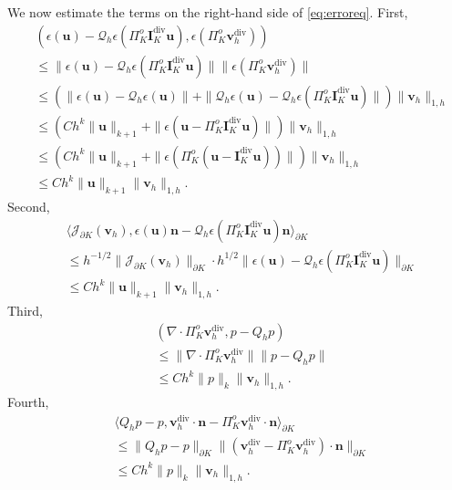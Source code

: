 \documentclass[review,hidelinks,onefignum,onetabnum]{siamart251216}
\begin{document}
We now estimate the terms on the right-hand side of \eqref{eq:erroreq}.
First,
\begin{align*}
& (\epsilon(\boldsymbol{u}) - \mathcal{Q}_h \epsilon(\Pi_K^o \boldsymbol{I}_K^{\operatorname{div}} \boldsymbol{u}), \epsilon(\Pi_K^o \boldsymbol{v}_h^{\operatorname{div}})) \\
&\le \| \epsilon(\boldsymbol{u}) - \mathcal{Q}_h \epsilon(\Pi_K^o \boldsymbol{I}_K^{\operatorname{div}} \boldsymbol{u}) \| 
   \| \epsilon(\Pi_K^o \boldsymbol{v}_h^{\operatorname{div}}) \| \\
&\le \left( \| \epsilon(\boldsymbol{u}) - \mathcal{Q}_h \epsilon(\boldsymbol{u}) \| 
   + \| \mathcal{Q}_h \epsilon(\boldsymbol{u}) - \mathcal{Q}_h \epsilon(\Pi_K^o \boldsymbol{I}_K^{\operatorname{div}} \boldsymbol{u}) \| \right) 
   \| \boldsymbol{v}_h \|_{1,h} \\
&\le \left( C h^k \|\boldsymbol{u}\|_{k+1} 
   + \| \epsilon(\boldsymbol{u} - \Pi_K^o \boldsymbol{I}_K^{\operatorname{div}} \boldsymbol{u}) \| \right) 
   \| \boldsymbol{v}_h \|_{1,h} \\
&\le \left( C h^k \|\boldsymbol{u}\|_{k+1} 
   + \| \epsilon(\Pi_K^o (\boldsymbol{u} - \boldsymbol{I}_K^{\operatorname{div}} \boldsymbol{u})) \| \right) 
   \| \boldsymbol{v}_h \|_{1,h} \\
&\le C h^k \|\boldsymbol{u}\|_{k+1} \| \boldsymbol{v}_h \|_{1,h}.
\end{align*}
Second,
\begin{align*}
& \langle \mathcal{J}_{\partial K}(\boldsymbol{v}_h), \epsilon(\boldsymbol{u})\boldsymbol{n} - \mathcal{Q}_h \epsilon(\Pi_K^o \boldsymbol{I}_K^{\operatorname{div}} \boldsymbol{u})\boldsymbol{n} \rangle_{\partial K} \\
&\le h^{-1/2} \| \mathcal{J}_{\partial K}(\boldsymbol{v}_h) \|_{\partial K} 
   \cdot h^{1/2} \| \epsilon(\boldsymbol{u}) - \mathcal{Q}_h \epsilon(\Pi_K^o \boldsymbol{I}_K^{\operatorname{div}} \boldsymbol{u}) \|_{\partial K} \\
&\le C h^k \|\boldsymbol{u}\|_{k+1} \| \boldsymbol{v}_h \|_{1,h}.
\end{align*}
Third,
\begin{align*}
& (\nabla \cdot \Pi_K^o \boldsymbol{v}_h^{\operatorname{div}}, p - Q_h p) \\
&\le \| \nabla \cdot \Pi_K^o \boldsymbol{v}_h^{\operatorname{div}} \| \| p - Q_h p \| \\
&\le C h^k \|p\|_k \| \boldsymbol{v}_h \|_{1,h}.
\end{align*}
Fourth,
\begin{align*}
& \langle Q_h p - p, \boldsymbol{v}_h^{\operatorname{div}} \cdot \boldsymbol{n} - \Pi_K^o \boldsymbol{v}_h^{\operatorname{div}} \cdot \boldsymbol{n} \rangle_{\partial K} \\
&\le \| Q_h p - p \|_{\partial K} \| (\boldsymbol{v}_h^{\operatorname{div}} - \Pi_K^o \boldsymbol{v}_h^{\operatorname{div}}) \cdot \boldsymbol{n} \|_{\partial K} \\
&\le C h^k \|p\|_k \| \boldsymbol{v}_h \|_{1,h}.
\end{align*}
\end{document}
